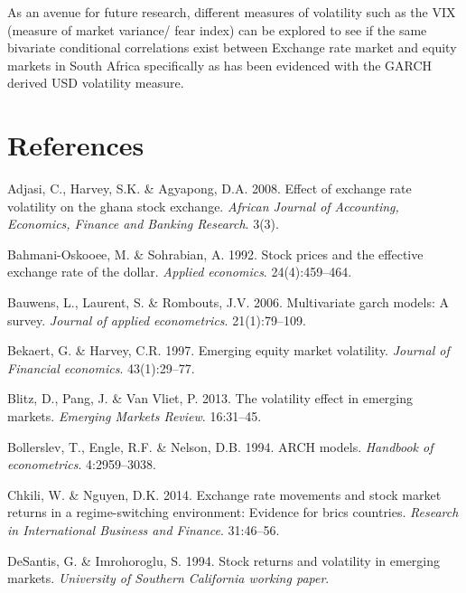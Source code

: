 \documentclass[11pt,preprint, authoryear]{elsarticle}
\numberwithin{equation}{section}
\numberwithin{figure}{section}
\numberwithin{table}{section}
\begin{document}
As an avenue for future research, different measures of volatility such
as the VIX (measure of market variance/ fear index) can be explored to
see if the same bivariate conditional correlations exist between
Exchange rate market and equity markets in South Africa specifically as
has been evidenced with the GARCH derived USD volatility measure.

\newpage

\hypertarget{references}{%
\section*{References}\label{references}}

\hypertarget{refs}{}
\leavevmode\hypertarget{ref-adjasi2008}{}%
Adjasi, C., Harvey, S.K. \& Agyapong, D.A. 2008. Effect of exchange rate
volatility on the ghana stock exchange. \emph{African Journal of
Accounting, Economics, Finance and Banking Research}. 3(3).

\leavevmode\hypertarget{ref-bahmani1992}{}%
Bahmani-Oskooee, M. \& Sohrabian, A. 1992. Stock prices and the
effective exchange rate of the dollar. \emph{Applied economics}.
24(4):459--464.

\leavevmode\hypertarget{ref-bauwens2006}{}%
Bauwens, L., Laurent, S. \& Rombouts, J.V. 2006. Multivariate garch
models: A survey. \emph{Journal of applied econometrics}. 21(1):79--109.

\leavevmode\hypertarget{ref-bekaert1997}{}%
Bekaert, G. \& Harvey, C.R. 1997. Emerging equity market volatility.
\emph{Journal of Financial economics}. 43(1):29--77.

\leavevmode\hypertarget{ref-blitz2013}{}%
Blitz, D., Pang, J. \& Van Vliet, P. 2013. The volatility effect in
emerging markets. \emph{Emerging Markets Review}. 16:31--45.

\leavevmode\hypertarget{ref-bollerslev1994}{}%
Bollerslev, T., Engle, R.F. \& Nelson, D.B. 1994. ARCH models.
\emph{Handbook of econometrics}. 4:2959--3038.

\leavevmode\hypertarget{ref-chkili2014}{}%
Chkili, W. \& Nguyen, D.K. 2014. Exchange rate movements and stock
market returns in a regime-switching environment: Evidence for brics
countries. \emph{Research in International Business and Finance}.
31:46--56.

\leavevmode\hypertarget{ref-desantis1994}{}%
DeSantis, G. \& Imrohoroglu, S. 1994. Stock returns and volatility in
emerging markets. \emph{University of Southern California working
paper}.
\end{document}
